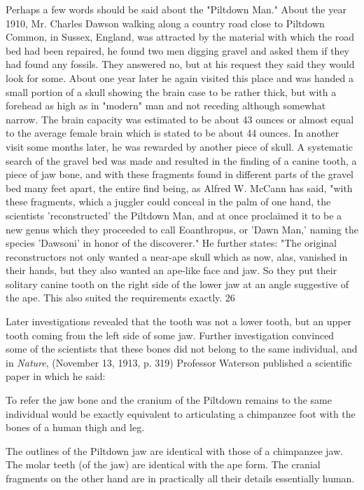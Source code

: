 Perhaps a few words should be said about the "Piltdown Man." About the year 1910, Mr.
Charles Dawson walking along a country road close to Piltdown Common, in Sussex,
England, was attracted by the material with which the road bed had been repaired, he found
two men digging gravel and asked them if they had found any fossils. They answered no, but
at his request they said they would look for some. About one year later he again visited this
place and was handed a small portion of a skull showing the brain case to be rather thick, but
with a forehead as high as in "modern" man and not receding although somewhat narrow.
The brain capacity was estimated to be about 43 ounces or almost equal to the average
female brain which is stated to be about 44 ounces. In another visit some months later, he
was rewarded by another piece of skull. A systematic search of the gravel bed was made and
resulted in the finding of a canine tooth, a piece of jaw bone, and with these fragments found
in different parts of the gravel bed many feet apart, the entire find being, as Alfred W.
McCann has said, "with these fragments, which a juggler could conceal in the palm of one
hand, the scientists 'reconstructed' the Piltdown Man, and at once proclaimed it to be a new
genus which they proceeded to call Eoanthropus, or 'Dawn Man,' naming the species
'Dawsoni' in honor of the discoverer." He further states: "The original reconstructors not only
wanted a near-ape skull which as now, alas, vanished in their hands, but they also wanted an
ape-like face and jaw. So they put their solitary canine tooth on the right side of the lower
jaw at an angle suggestive of the ape. This also suited the requirements exactly. 26

Later investigations revealed that the tooth was not a lower tooth, but an upper tooth coming
from the left side of some jaw. Further investigation convinced some of the scientists that
these bones did not belong to the same individual, and in \textit{Nature}, (November 13, 1913, p.
319) Professor Waterson published a scientific paper in which he said:

To refer the jaw bone and the cranium of the Piltdown remains to the same individual would
be exactly equivalent to articulating a chimpanzee foot with the bones of a human thigh and
leg.

The outlines of the Piltdown jaw are identical with those of a chimpanzee jaw. The molar
teeth (of the jaw) are identical with the ape form. The cranial fragments on the other hand are
in practically all their details essentially human.

